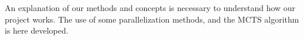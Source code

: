 An explanation of our methods and concepts is necessary to understand how our project works. The use of some parallelization methods, and the MCTS algorithm is here developed.